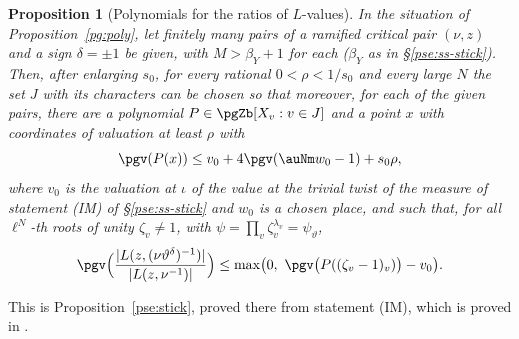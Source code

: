\documentclass[10pt]{amsart}
\newtheorem{proposition}[theorem]{Proposition}
\theoremstyle{definition}
\theoremstyle{remark}
\begin{document}
\begin{proposition}[Polynomials for the ratios of $L$-values]\label{pg:stick}
In the situation of Proposition~\ref{pg:poly}, let finitely many pairs of a ramified critical
pair $(\nu,z)$ and a sign $\delta=\pm1$ be given, with $M>\beta_Y+1$ for each ($\beta_Y$ as in
\S\ref{pse:ss-stick}). Then, after enlarging $s_0$, for every rational $0<\rho<1/s_0$ and every
large $N$ the set $J$ with its characters can be chosen so that moreover, for each of the given
pairs, there are a polynomial $P\in\pgZb[X_v:v\in J]$ and a point $x$ with coordinates of valuation
at least $\rho$ with
\[
\pgv(P(x))\le v_0+4\pgv(\auNm w_0-1)+s_0\rho ,
\]
where $v_0$ is the valuation at $\iota$ of the value at the trivial twist of the measure of
statement (IM) of \S\ref{pse:ss-stick} and $w_0$ is a chosen place, and such that, for all
$\ell^N$-th roots of unity $\zeta_v\ne1$, with $\psi=\prod_v\zeta_v^{\lambda_v}=\psi_\vartheta$,
\[
\pgv\Bigl(\frac{|L(z,(\nu\vartheta^{\delta})^{-1})|}{|L(z,\nu^{-1})|}\Bigr)\le
\max\bigl(0,\ \pgv\bigl(P((\zeta_v-1)_v)\bigr)-v_0\bigr).
\]
\end{proposition}
\smallskip\noindent This is Proposition~\ref{pse:stick}, proved there from statement (IM), which is
proved in {\cite[Propositions~3.8 and~3.12]{P54}}.\par\smallskip
\end{document}
